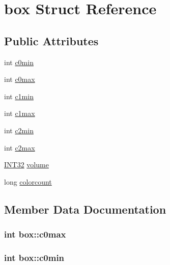 \hypertarget{structbox}{}\section{box Struct Reference}
\label{structbox}
\subsection*{Public Attributes}
\begin{DoxyCompactItemize}
\item 
int \hyperlink{structbox_acf78968f99d9730f516003fc77a60f07}{c0min}
\item 
int \hyperlink{structbox_a9a9cb397dbffdd1b17cc670834e3fb4d}{c0max}
\item 
int \hyperlink{structbox_a81563b63e4a79ca40bdfeacf5070a6d9}{c1min}
\item 
int \hyperlink{structbox_a5313694dbee838c7f4d5f409e954460e}{c1max}
\item 
int \hyperlink{structbox_a781a101c49c5e4a789967569994d924d}{c2min}
\item 
int \hyperlink{structbox_a1fe5b5ab81ed7e8e3f104deb168576cd}{c2max}
\item 
\hyperlink{jmorecfg_8h_a0cb58e7e6f0bad369840a52e54a56ae0}{I\+N\+T32} \hyperlink{structbox_acaba83fb8356e20d21793c23c41033a1}{volume}
\item 
long \hyperlink{structbox_af92a3080724bf452855f631e901b803c}{colorcount}
\end{DoxyCompactItemize}


\subsection{Member Data Documentation}
\hypertarget{structbox_a9a9cb397dbffdd1b17cc670834e3fb4d}{}
\subsubsection[{c0max}]{\setlength{\rightskip}{0pt plus 5cm}int box\+::c0max}\label{structbox_a9a9cb397dbffdd1b17cc670834e3fb4d}
\hypertarget{structbox_acf78968f99d9730f516003fc77a60f07}{}
\subsubsection[{c0min}]{\setlength{\rightskip}{0pt plus 5cm}int box\+::c0min}\label{structbox_acf78968f99d9730f516003fc77a60f07}
\hypertarget{structbox_a5313694dbee838c7f4d5f409e954460e}{}
